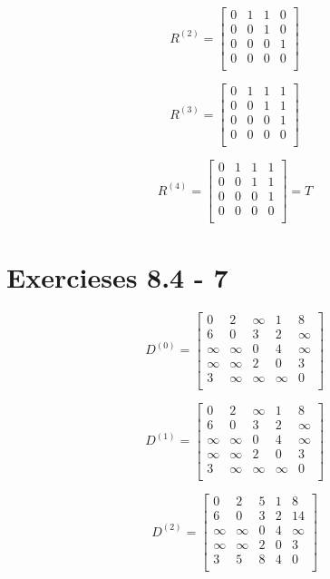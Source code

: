 \documentclass{article}
\begin{document}
\[
R^{(2)} = 
\left[
\begin{array}{cccc}
0 & 1 & 1 & 0 \\
0 & 0 & 1 & 0 \\
0 & 0 & 0 & 1 \\
0 & 0 & 0 & 0 \\
\end{array}
\right]
\]

\[
R^{(3)} = 
\left[
\begin{array}{cccc}
0 & 1 & 1 & 1 \\
0 & 0 & 1 & 1 \\
0 & 0 & 0 & 1 \\
0 & 0 & 0 & 0 \\
\end{array}
\right]
\]

\[
R^{(4)} = 
\left[
\begin{array}{cccc}
0 & 1 & 1 & 1 \\
0 & 0 & 1 & 1 \\
0 & 0 & 0 & 1 \\
0 & 0 & 0 & 0 \\
\end{array}
\right]
= T
\]

\section{Exercieses 8.4 - 7}

\[
D^{(0)} = 
\left[
\begin{array}{ccccc}
0 & 2 & \infty & 1 & 8 \\
6 & 0 & 3 & 2 & \infty \\
\infty & \infty & 0 & 4 & \infty \\
\infty & \infty & 2 & 0 & 3 \\
3 & \infty & \infty & \infty & 0 \\
\end{array}
\right]
\]

\[
D^{(1)} = 
\left[
\begin{array}{ccccc}
0 & 2 & \infty & 1 & 8 \\
6 & 0 & 3 & 2 & \infty \\
\infty & \infty & 0 & 4 & \infty \\
\infty & \infty & 2 & 0 & 3 \\
3 & \infty & \infty & \infty & 0 \\
\end{array}
\right]
\]

\[
D^{(2)} = 
\left[
\begin{array}{ccccc}
0 & 2 & 5 & 1 & 8 \\
6 & 0 & 3 & 2 & 14 \\
\infty & \infty & 0 & 4 & \infty \\
\infty & \infty & 2 & 0 & 3 \\
3 & 5 & 8 & 4 & 0 \\
\end{array}
\right]
\]
\end{document}
